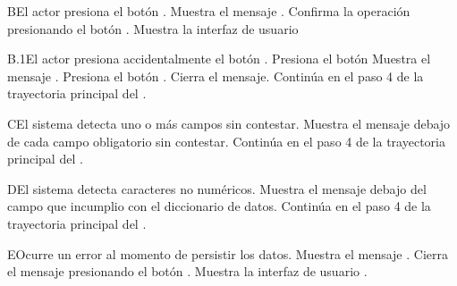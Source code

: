 \begin{UCtrayectoriaA}{B}{El actor presiona el botón .}
	\UCpaso Muestra el mensaje .
	\UCpaso[\UCactor] Confirma la operación presionando el botón .
	\UCpaso Muestra la interfaz de usuario 
\end{UCtrayectoriaA}

\begin{UCtrayectoriaA}{B.1}{El actor presiona accidentalmente el botón .}
	\UCpaso[\UCactor] Presiona el botón 
	\UCpaso Muestra el mensaje .
	\UCpaso[\UCactor] Presiona el botón .
	\UCpaso Cierra el mensaje.
	\UCpaso Continúa en el paso 4 de la trayectoria principal del .
\end{UCtrayectoriaA}

\begin{UCtrayectoriaA}{C}{El sistema detecta uno o más campos sin contestar.}
	\UCpaso Muestra el mensaje  debajo de cada campo obligatorio sin contestar.
	\UCpaso Continúa en el paso 4 de la trayectoria principal del .
\end{UCtrayectoriaA}

\begin{UCtrayectoriaA}{D}{El sistema detecta caracteres no numéricos.}
	\UCpaso Muestra el mensaje  debajo del campo que incumplio con el diccionario de datos.
	\UCpaso Continúa en el paso 4 de la trayectoria principal del .
\end{UCtrayectoriaA}

\begin{UCtrayectoriaA}{E}{Ocurre un error al momento de persistir los datos.}
	\UCpaso Muestra el mensaje .
	\UCpaso[\UCactor] Cierra el mensaje presionando el botón .
	\UCpaso Muestra la interfaz de usuario .
\end{UCtrayectoriaA}


